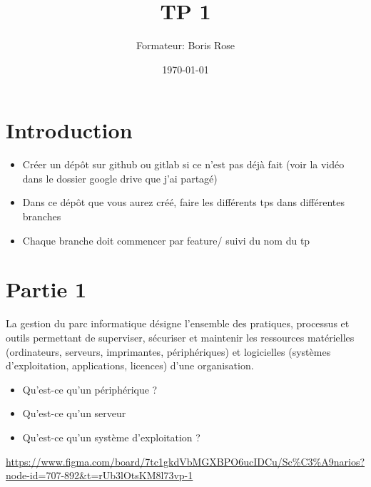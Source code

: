 \documentclass[12pt, letterpaper]{article}
\title{TP 1}
\author{Formateur: Boris Rose}
\date{\today}
\begin{document}
\maketitle

\section*{Introduction}

\begin{tcolorbox}[colback=brown!5,colframe=brown!60!black,title=Consignes]

\begin{itemize}
    \item Créer un dépôt sur github ou gitlab si ce n'est pas déjà fait (voir la vidéo dans le dossier google drive que j'ai partagé)
    \item Dans ce dépôt que vous aurez créé, faire les différents tps dans différentes branches
    \item Chaque branche doit commencer par feature/ suivi du nom du tp 
\end{itemize}


\end{tcolorbox}


\section*{Partie 1}

\begin{tcolorbox}[colback=cyan!5,colframe=cyan!60!black,title=Définition]
La gestion du parc informatique désigne l’ensemble des pratiques, processus et outils permettant de superviser, sécuriser et maintenir les ressources matérielles (ordinateurs, serveurs, imprimantes, périphériques) et logicielles (systèmes d’exploitation, applications, licences) d’une organisation.
\end{tcolorbox}

\begin{itemize}
    \item Qu'est-ce qu'un périphérique ?
    \item Qu'est-ce qu'un serveur
    \item Qu'est-ce qu'un système d'exploitation ?
\end{itemize}


\begin{tcolorbox}[colback=cyan!5,colframe=cyan!60!black,title=Figma du Cours]
    \url{https://www.figma.com/board/7tc1gkdVbMGXBPO6ucIDCu/Sc%C3%A9narios?node-id=707-892&t=rUb3lOtsKM8l73vp-1}
\end{tcolorbox}
\end{document}

